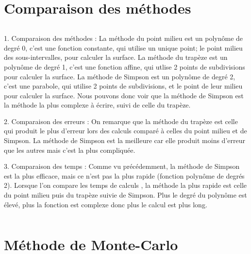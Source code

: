\documentclass{article}
\begin{document}
\section{Comparaison des méthodes}
$$ $$

1. Comparaison des méthodes :
\newline
\newline
La méthode du point milieu est un polynôme de degré 0, c'est une fonction constante, qui utilise un unique point; le point milieu des sous-intervalles, pour calculer la surface.
\newline
La méthode du trapèze est un polynôme de degré 1, c'est une fonction affine, qui utlise 2 points de subdivisions pour calculer la surface.
\newline
La méthode de Simpson est un polynôme de degré 2, c'est une parabole, qui utilise 2 points de subdivisions, et le point de leur milieu pour calculer la surface.
\newline
Nous pouvons donc voir que la méthode de Simpson est la méthode la plus complexe à écrire, suivi de celle du trapèze.
\newline
\newline

2. Comparaison des erreurs :
\newline
\newline
On remarque que la méthode du trapèze est celle qui produit le plus d'erreur lors des calculs comparé à celles du point milieu et de Simpson.
La méthode de Simpson est la meilleure car elle produit moins d'erreur que les autres mais c'est la plus compliquée.
\newline
\newline

3. Comparaison des temps :
\newline
\newline
Comme vu précédemment, la méthode de Simpson est la plus efficace, mais ce n'est pas la plus rapide (fonction polynôme de degrés 2). Lorsque l'on compare les temps de calculs , la méthode la plus rapide est celle du point milieu puis du trapèze suivie de Simpson. Plus le degré du polynôme est élevé, plus la fonction est complexe donc plus le calcul est plus long.

$$ $$
$$ $$ 
$$ $$
$$ $$
$$ $$
$$ $$

\section{Méthode de Monte-Carlo}
$$ $$
\end{document}
